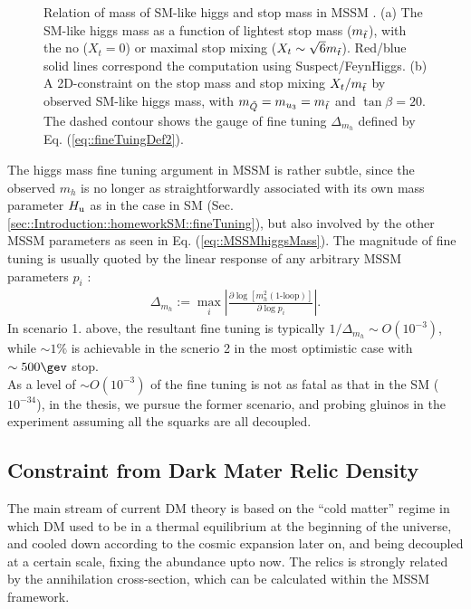 \begin{figure}[h]
  \centering
    \caption{Relation of mass of SM-like higgs and stop mass in MSSM \cite{Higgs125SUSYHall}. (a) The SM-like higgs mass as a function of lightest stop mass ($m_{\tilde{t}}$), with the no ($X_t=0$) or maximal stop mixing ($X_t \sim \sqrt{6}m_{\tilde{t}}$). Red/blue solid lines correspond the computation using Suspect/FeynHiggs.  (b) A 2D-constraint on the stop mass and stop mixing $X_t/m_{\tilde{t}}$ by observed SM-like higgs mass, with $m_{\tilde{Q}} = m_{u_3} = m_{\tilde{t}}$ and $\tan{\beta}=20$. The dashed contour shows the gauge of fine tuning $\Delta_{m_{h}}$ defined by Eq. (\ref{eq::fineTuingDef2}). }
    \label{fig::Introduction::higgsMass_mixing}
\end{figure}

The higgs mass fine tuning argument in MSSM is rather subtle, since the observed $m_{h}$ is no longer as straightforwardly associated with its own mass parameter $H_{\mathrm{u}}$ as in the case in SM (Sec. \ref{sec::Introduction::homeworkSM::fineTuning}), but also involved by the other MSSM parameters as seen in Eq. (\ref{eq::MSSMhiggsMass}).
The magnitude of fine tuning is usually quoted by the linear response of any arbitrary MSSM parameters $p_i$ \cite{Higgs125SUSYHall}:
\begin{align}
\Delta_{m_{h}} := \max_i \left|  \frac{\partial \log [m^2_h (\mbox{1-loop})] }{\partial \log{p_i}} \right|.
\label{eq::fineTuingDef2}
\end{align}
In scenario 1. above, the resultant fine tuning is typically $1/\Delta_{m_{h}} \sim O(10^{-3})$, while $\sim 1\%$ is achievable in the scnerio 2 in the most optimistic case with $\sim 500\gev$ stop.  \\
%
As a level of $\sim O(10^{-3})$ of the fine tuning is not as fatal as that in the SM ($10^{-34}$),
in the thesis, we pursue the former scenario, and probing gluinos in the experiment assuming all the squarks are all decoupled. \\
%


\clearpage
\subsection{Constraint from Dark Mater Relic Density} \label{sec::Introduction::DMconstraint}
The main stream of current DM theory is based on the ``cold matter'' regime in which DM used to be in a thermal equilibrium at the beginning of the universe, and cooled down according to the cosmic expansion later on, and being decoupled at a certain scale, fixing the abundance upto now. The relics is strongly related by the annihilation cross-section, which can be calculated within the MSSM framework. \\

